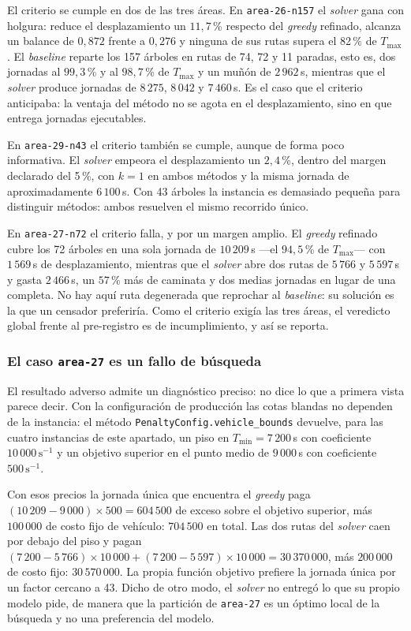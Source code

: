 El criterio se cumple en dos de las tres áreas. En \texttt{area-26-n157} el
\textit{solver} gana con holgura: reduce el desplazamiento un $11{,}7$\,\%
respecto del \textit{greedy} refinado, alcanza un balance de $0{,}872$ frente a
$0{,}276$ y ninguna de sus rutas supera el 82\,\% de $T_{\max}$. El
\textit{baseline} reparte los 157 árboles en rutas de 74, 72 y 11 paradas, esto
es, dos jornadas al $99{,}3$\,\% y al $98{,}7$\,\% de $T_{\max}$ y un muñón de
$2\,962$\,s, mientras que el \textit{solver} produce jornadas de $8\,275$,
$8\,042$ y $7\,460$\,s. Es el caso que el criterio anticipaba: la ventaja del
método no se agota en el desplazamiento, sino en que entrega jornadas
ejecutables.

En \texttt{area-29-n43} el criterio también se cumple, aunque de forma poco
informativa. El \textit{solver} empeora el desplazamiento un $2{,}4$\,\%, dentro
del margen declarado del 5\,\%, con $k=1$ en ambos métodos y la misma jornada de
aproximadamente $6\,100$\,s. Con 43 árboles la instancia es demasiado pequeña
para distinguir métodos: ambos resuelven el mismo recorrido único.

En \texttt{area-27-n72} el criterio falla, y por un margen amplio. El
\textit{greedy} refinado cubre los 72 árboles en una sola jornada de
$10\,209$\,s ---el $94{,}5$\,\% de $T_{\max}$--- con $1\,569$\,s de
desplazamiento, mientras que el \textit{solver} abre dos rutas de $5\,766$ y
$5\,597$\,s y gasta $2\,466$\,s, un $57$\,\% más de caminata y dos medias
jornadas en lugar de una completa. No hay aquí ruta degenerada que reprochar al
\textit{baseline}: su solución es la que un censador preferiría. Como el criterio
exigía las tres áreas, el veredicto global frente al pre-registro es de
incumplimiento, y así se reporta.

\subsubsection*{El caso \texttt{area-27} es un fallo de búsqueda}

El resultado adverso admite un diagnóstico preciso: no dice lo que a primera vista parece decir. Con la configuración de producción
las cotas blandas no dependen de la instancia: el método
\texttt{PenaltyConfig.vehicle\_bounds} devuelve, para las cuatro instancias de
este apartado, un piso en $T_{\min} = 7\,200$\,s con coeficiente
$10\,000\,\text{s}^{-1}$ y un objetivo superior en el punto medio de
$9\,000$\,s con coeficiente $500\,\text{s}^{-1}$.

Con esos precios la jornada única que encuentra el \textit{greedy} paga
$(10\,209 - 9\,000) \times 500 = 604\,500$ de exceso sobre el objetivo superior,
más $100\,000$ de costo fijo de vehículo: $704\,500$ en total. Las dos rutas del
\textit{solver} caen por debajo del piso y pagan
$(7\,200 - 5\,766) \times 10\,000 + (7\,200 - 5\,597) \times 10\,000 =
30\,370\,000$, más $200\,000$ de costo fijo: $30\,570\,000$. La propia función
objetivo prefiere la jornada única por un factor cercano a 43. Dicho de otro
modo, el \textit{solver} no entregó lo que su propio modelo pide, de manera que
la partición de \texttt{area-27} es un óptimo local de la búsqueda y no una
preferencia del modelo.

